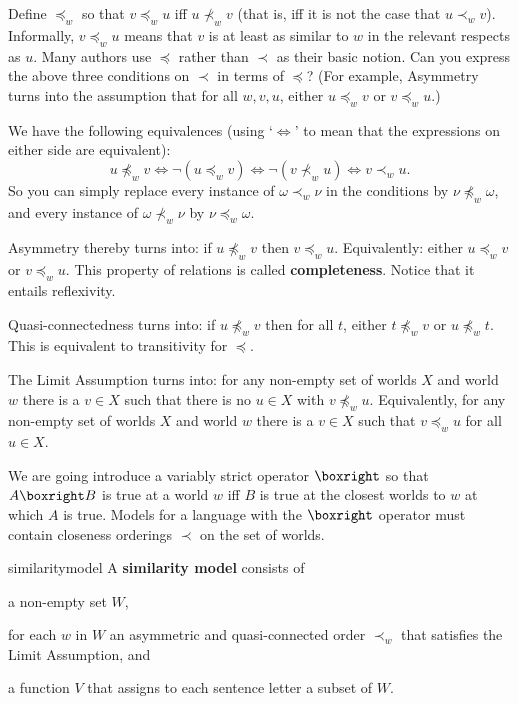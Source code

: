 \begin{exercise}
  Define $\preceq_{w}$ so that $v \preceq_w u$ iff $u \nprec_w v$ (that is, iff
  it is not the case that $u \prec_{w} v$). Informally, $v \preceq_w u$ means
  that $v$ is at least as similar to $w$ in the relevant respects as $u$. Many
  authors use $\preceq$ rather than $\prec$ as their basic notion. Can you
  express the above three conditions on $\prec$ in terms of $\preceq$? (For
  example, Asymmetry turns into the assumption that for all $w,v,u$, either
  $u \preceq_{w} v$ or $v \preceq_{w} u$.)
\end{exercise}
\begin{solution}
  We have the following equivalences (using `$\Leftrightarrow$' to mean that the
  expressions on either side are equivalent):
  \[
    u \npreceq_w v \Leftrightarrow \neg (u \preceq_w v) \Leftrightarrow \neg(v \nprec_w u) \Leftrightarrow v \prec_w u.
  \]
  So you can simply replace every instance of $\omega \prec_{w} \nu$ in the
  conditions by $\nu \npreceq_{w} \omega$, and every instance of
  $\omega \nprec_{w} \nu$ by $\nu \preceq_{w} \omega$.

  Asymmetry thereby turns into: if $u \npreceq_{w} v$ then $v \preceq_{w} u$.
  Equivalently: either $u \preceq_{w} v$ or $v \preceq_{w} u$. This
  property of relations is called \textbf{completeness}. Notice that it
  entails reflexivity.

  Quasi-connectedness turns into: if $u \npreceq_{w} v$ then for all $t$, either
  $t \npreceq_{w} v$ or $u \npreceq_{w} t$. This is equivalent to transitivity
  for $\preceq$.


  The Limit Assumption turns into: for any non-empty set of worlds $X$ and world
  $w$ there is a $v\in X$ such that there is no $u \in X$ with
  $v \npreceq_{w} u$. Equivalently, for any non-empty set of worlds $X$
  and world $w$ there is a $v\in X$ such that $v \preceq_{w} u$ for all $u\in X$.
\end{solution}

We are going introduce a variably strict operator $\boxright$ so that
$A\boxright B$ is true at a world $w$ iff $B$ is true at the closest worlds to
$w$ at which $A$ is true. Models for a language with the $\boxright$ operator
must contain closeness orderings $\prec$ on the set of worlds.

\begin{definition}{}{similaritymodel}
  A \textbf{similarity model} consists of
  \vspace{-3mm}
  \begin{itemize*}
  \item a non-empty set $W$,
  \item for each $w$ in $W$ an asymmetric and quasi-connected order $\prec_w$
  that satisfies the Limit Assumption, and
  \item a function $V$ that assigns to each sentence letter a subset of $W$.
  \end{itemize*}
\end{definition}

